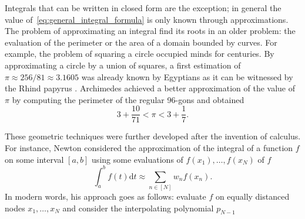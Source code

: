 \documentclass[twoside,11pt]{book}
\numberwithin{theorem}{chapter}
\numberwithin{definition}{chapter}
\numberwithin{proposition}{chapter}
\numberwithin{corollary}{chapter}
\numberwithin{example}{chapter}
\numberwithin{lemma}{chapter}
\numberwithin{assumption}{chapter}
\begin{document}
Integrals that can be written in closed form are the exception; in general the value of~\eqref{eq:general_integral_formula} is only known through approximations. The problem of approximating an integral find its roots in an older problem:
the evaluation of the perimeter or the area of a domain bounded by curves. For example, the problem of squaring a circle occupied minds for centuries. By approximating a circle by a union of squares, a first estimation of $\pi \approx 256/81 \approx 3.1605$ was already known by Egyptians as it can be witnessed by the Rhind papyrus \citep{RoSh87}. Archimedes achieved a better approximation of the value of $\pi$ by computing the perimeter of the regular 96-gons and obtained \citep{Hea03}
$$3+\frac{10}{71} < \pi < 3+\frac{1}{7}.$$


 These geometric techniques were further developed after the invention of calculus. For instance, Newton considered the approximation of the integral of a function $f$ on some interval $[a,b]$ using some evaluations of $f(x_{1}), \dots, f(x_{N})$ of $f$
\begin{equation}
\int_{a}^{b}f(t)\mathrm{d}t \approx \sum\limits_{n \in [N]}w_{n}f(x_{n}).
\end{equation}
 In modern words, his approach goes as follows: evaluate $f$ on equally distanced nodes $x_{1}, \dots, x_{N}$ and consider the interpolating polynomial $p_{N-1}$

\end{document}
